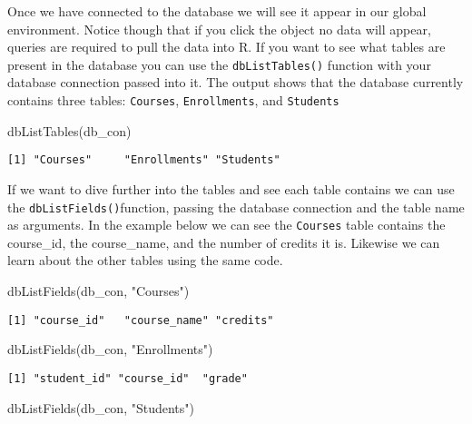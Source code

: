 \documentclass[
  letterpaper,
  DIV=11,
  numbers=noendperiod]{scrreprt}
\newenvironment{Shaded}{\begin{snugshade}}{\end{snugshade}}
\newcommand{\FunctionTok}[1]{\textcolor[rgb]{0.28,0.35,0.67}{#1}}
\newcommand{\NormalTok}[1]{\textcolor[rgb]{0.00,0.23,0.31}{#1}}
\newcommand{\StringTok}[1]{\textcolor[rgb]{0.13,0.47,0.30}{#1}}
\begin{document}
Once we have connected to the database we will see it appear in our
global environment. Notice though that if you click the object no data
will appear, queries are required to pull the data into R. If you want
to see what tables are present in the database you can use the
\texttt{dbListTables()} function with your database connection passed
into it. The output shows that the database currently contains three
tables: \texttt{Courses}, \texttt{Enrollments}, and \texttt{Students}

\begin{Shaded}
\begin{Highlighting}[]
\FunctionTok{dbListTables}\NormalTok{(db\_con)}
\end{Highlighting}
\end{Shaded}

\begin{verbatim}
[1] "Courses"     "Enrollments" "Students"   
\end{verbatim}

If we want to dive further into the tables and see each table contains
we can use the \texttt{dbListFields()}function, passing the database
connection and the table name as arguments. In the example below we can
see the \texttt{Courses} table contains the course\_id, the
course\_name, and the number of credits it is. Likewise we can learn
about the other tables using the same code.

\begin{Shaded}
\begin{Highlighting}[]
\FunctionTok{dbListFields}\NormalTok{(db\_con, }\StringTok{"Courses"}\NormalTok{)}
\end{Highlighting}
\end{Shaded}

\begin{verbatim}
[1] "course_id"   "course_name" "credits"    
\end{verbatim}

\begin{Shaded}
\begin{Highlighting}[]
\FunctionTok{dbListFields}\NormalTok{(db\_con, }\StringTok{"Enrollments"}\NormalTok{)}
\end{Highlighting}
\end{Shaded}

\begin{verbatim}
[1] "student_id" "course_id"  "grade"     
\end{verbatim}

\begin{Shaded}
\begin{Highlighting}[]
\FunctionTok{dbListFields}\NormalTok{(db\_con, }\StringTok{"Students"}\NormalTok{)}
\end{Highlighting}
\end{Shaded}
\end{document}

